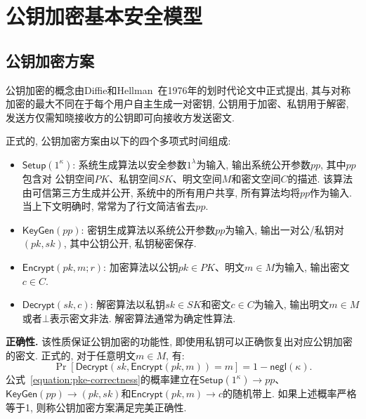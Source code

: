 \section{公钥加密基本安全模型}
\subsection{公钥加密方案}
公钥加密的概念由Diffie和Hellman~\cite{DH-IEEE-IT-1976}在1976年的划时代论文中正式提出, 
其与对称加密的最大不同在于每个用户自主生成一对密钥, 公钥用于加密、私钥用于解密, 发送方仅需知晓接收方的公钥即可向接收方发送密文. 

\begin{definition}[公钥加密方案]
正式的, 公钥加密方案由以下的四个多项式时间组成:   
\begin{itemize}
\item $\mathsf{Setup}(1^\kappa)$: 系统生成算法以安全参数$1^\lambda$为输入, 输出系统公开参数$pp$, 其中$pp$包含对
	公钥空间$PK$、私钥空间$SK$、明文空间$M$和密文空间$C$的描述. 该算法由可信第三方生成并公开, 系统中的所有用户共享, 所有算法均将$pp$作为输入.  
	当上下文明确时, 常常为了行文简洁省去$pp$. 

\item $\mathsf{KeyGen}(pp)$: 密钥生成算法以系统公开参数$pp$为输入, 输出一对公/私钥对$(pk, sk)$, 其中公钥公开, 私钥秘密保存. 

\item $\mathsf{Encrypt}(pk, m; r)$: 加密算法以公钥$pk \in PK$、明文$m \in M$为输入, 输出密文$c \in C$. 

\item $\mathsf{Decrypt}(sk, c)$: 解密算法以私钥$sk \in SK$和密文$c \in C$为输入, 
	输出明文$m \in M$或者$\bot$表示密文非法. 解密算法通常为确定性算法. 
\end{itemize}
\end{definition}

\begin{trivlist}
\item \textbf{正确性.} 该性质保证公钥加密的功能性, 即使用私钥可以正确恢复出对应公钥加密的密文. 正式的, 对于任意明文$m \in M$, 有:
\begin{equation}\label{equation:pke-correctness}
	\Pr[\mathsf{Decrypt}(sk, \mathsf{Encrypt}(pk, m)) = m] = 1 - \mathsf{negl}(\kappa).
\end{equation}
公式~\eqref{equation:pke-correctness}的概率建立在$\mathsf{Setup}(1^\kappa) \rightarrow pp$、
$\mathsf{KeyGen}(pp) \rightarrow (pk, sk)$和$\mathsf{Encrypt}(pk, m) \rightarrow c$的随机带上. 
如果上述概率严格等于1, 则称公钥加密方案满足完美正确性. 
\end{trivlist}

